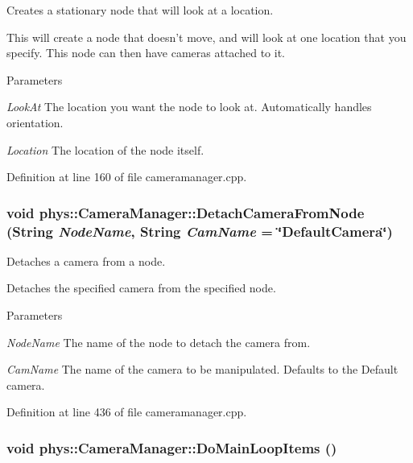 Creates a stationary node that will look at a location. 

This will create a node that doesn't move, and will look at one location that you specify. This node can then have cameras attached to it. 
\begin{DoxyParams}{Parameters}
\item[{\em LookAt}]The location you want the node to look at. Automatically handles orientation. \item[{\em Location}]The location of the node itself. \end{DoxyParams}


Definition at line 160 of file cameramanager.cpp.

\hypertarget{classphys_1_1CameraManager_a5137bdb9dec706fa0fafec665d4f71c8}{
\subsubsection[{DetachCameraFromNode}]{\setlength{\rightskip}{0pt plus 5cm}void phys::CameraManager::DetachCameraFromNode ({\bf String} {\em NodeName}, \/  {\bf String} {\em CamName} = {\ttfamily \char`\"{}DefaultCamera\char`\"{}})}}
\label{d9/d91/classphys_1_1CameraManager_a5137bdb9dec706fa0fafec665d4f71c8}


Detaches a camera from a node. 

Detaches the specified camera from the specified node. 
\begin{DoxyParams}{Parameters}
\item[{\em NodeName}]The name of the node to detach the camera from. \item[{\em CamName}]The name of the camera to be manipulated. Defaults to the Default camera. \end{DoxyParams}


Definition at line 436 of file cameramanager.cpp.

\hypertarget{classphys_1_1CameraManager_aaae22266bccc43f6efa66d2735d7d1d3}{
\subsubsection[{DoMainLoopItems}]{\setlength{\rightskip}{0pt plus 5cm}void phys::CameraManager::DoMainLoopItems ()}}
\label{d9/d91/classphys_1_1CameraManager_aaae22266bccc43f6efa66d2735d7d1d3}



